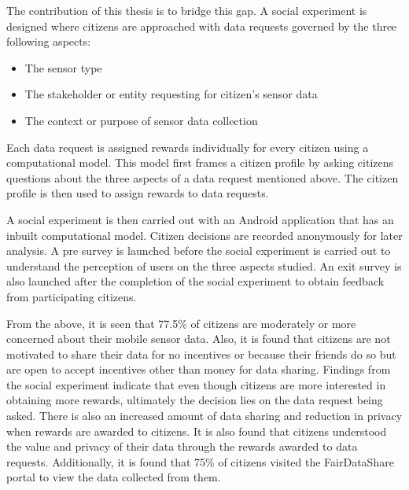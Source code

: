 The contribution of this thesis is to bridge this gap. A social experiment is designed where citizens are approached with data requests governed by the three following aspects:

\begin{itemize}
\item The sensor type
\item The stakeholder or entity requesting for citizen's sensor data
\item The context or purpose of sensor data collection
\end{itemize} 

Each data request is assigned rewards individually for every citizen using a computational model. This model first frames a citizen profile by asking citizens questions about the three aspects of a data request mentioned above. The citizen profile is then used to assign rewards to data requests.

A social experiment is then carried out with an Android application that has an inbuilt computational model. Citizen decisions are recorded anonymously for later analysis. A pre survey is launched before the social experiment is carried out to understand the perception of users on the three aspects studied. An exit survey is also launched after the completion of the social experiment to obtain feedback from participating citizens. 

From the above, it is seen that 77.5\% of citizens are moderately or more concerned about their mobile sensor data. Also, it is found that citizens are not motivated to share their data for no incentives or because their friends do so but are open to accept incentives other than money for data sharing. Findings from the social experiment indicate that even though citizens are more interested in obtaining more rewards, ultimately the decision lies on the data request being asked. There is also an increased amount of data sharing and reduction in privacy when rewards are awarded to citizens. It is also found that citizens understood the value and privacy of their data through the rewards awarded to data requests. Additionally, it is found that 75\% of citizens visited the FairDataShare portal to view the data collected from them.  

